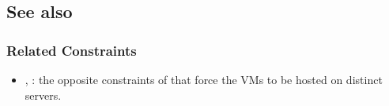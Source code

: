 \subsection{See also}

\subsubsection{Related Constraints}
\begin{itemize}
\item {}, : the opposite constraints of  that force the VMs to be hosted on distinct servers.
\end{itemize}

